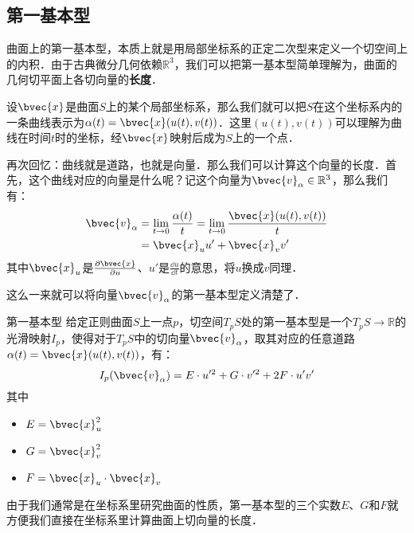 

\subsection{第一基本型}

曲面上的第一基本型，本质上就是用局部坐标系的正定二次型来定义一个切空间上的内积．由于古典微分几何依赖$\mathbb{R}^3$，我们可以把第一基本型简单理解为，曲面的几何切平面上各切向量的\textbf{长度}．

设$\bvec{x}$是曲面$S$上的某个局部坐标系，那么我们就可以把$S$在这个坐标系内的一条曲线表示为$\alpha(t)=\bvec{x}(u(t), v(t))$．这里$(u(t), v(t))$可以理解为曲线在时间$t$时的坐标，经$\bvec{x}$映射后成为$S$上的一个点．

再次回忆：曲线就是道路，也就是向量．那么我们可以计算这个向量的长度．首先，这个曲线对应的向量是什么呢？记这个向量为$\bvec{v}_\alpha\in\mathbb{R}^3$，那么我们有：
\begin{equation}
\begin{aligned}
\bvec{v}_\alpha&=\lim\limits_{t\to 0}\frac{\alpha(t)}{t}=\lim\limits_{t\to 0}\frac{\bvec{x}(u(t), v(t))}{t}\\
&=\bvec{x}_uu'+\bvec{x}_vv'
\end{aligned}
\end{equation}
其中$\bvec{x}_u$是$\frac{\partial\bvec{x}}{\partial u}$、$u'$是$\frac{\dd u}{\dd t}$的意思，将$u$换成$v$同理．

这么一来就可以将向量$\bvec{v}_\alpha$的第一基本型定义清楚了．

\begin{definition}{第一基本型}
给定正则曲面$S$上一点$p$，切空间$T_pS$处的第一基本型是一个$T_pS\to \mathbb{R}$的光滑映射$I_p$，使得对于$T_pS$中的切向量$\bvec{v}_\alpha$，取其对应的任意道路$\alpha(t)=\bvec{x}(u(t), v(t))$，有：$$I_p(\bvec{v}_\alpha)=E\cdot u'^2+G\cdot v'^2+ 2F\cdot u'v'$$
其中
\begin{itemize}
\item $E=\bvec{x}_u^2$
\item $G=\bvec{x}_v^2$
\item $F=\bvec{x}_u\cdot\bvec{x}_v$
\end{itemize}
\end{definition}

由于我们通常是在坐标系里研究曲面的性质，第一基本型的三个实数$E$、$G$和$F$就方便我们直接在坐标系里计算曲面上切向量的长度．

